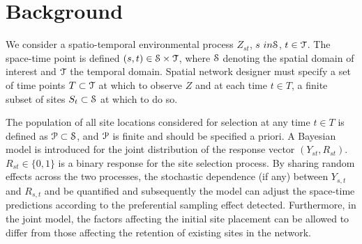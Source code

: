 \section{Background}
We consider a spatio-temporal environmental process $Z_{st}$, $s\ in \mathcal{S}$, $t\in \mathcal{T}$.
The space-time point is defined $(s, t) \in \mathcal{S} \times \mathcal{T}$, where $\mathcal{S}$ denoting the spatial 
domain of interest and $\mathcal{T}$ the temporal domain. 
Spatial network designer must specify a set of time points $T \subset \mathcal{T}$ at which to observe
$Z$ and at each time $t \in T$, a finite subset of sites $S_t \subset \mathcal{S}$ at which to do so.

The population of all site locations considered for selection at any time $t \in T$ is defined as 
$\mathcal{P} \subset \mathcal{S}$, and $\mathcal{P}$ is finite and should be specified a priori. 
A Bayesian model is introduced for the joint distribution of the response vector $(Y_{st}, R_{st})$.
$R_{st} \in \{0, 1\}$ is a binary response for the site selection process.
By sharing random effects across the two processes, the stochastic dependence (if any) between 
$Y_{s, t}$ and $R_{s, t}$ and be quantified and subsequently the model can adjust the space-time
predictions according to the preferential sampling effect detected.
Furthermore, in the joint model, the factors affecting the initial site placement can be allowed to
differ from those affecting the retention of existing sites in the network.

